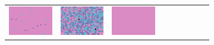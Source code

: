 \documentclass{ipol}
\begin{document}
\begin{figure}[ht]
\begin{subfigure}[t]{\linewidth}
\begin{tabular}{ccccccccc}
                \includegraphics[width=\s]{images/tower/DCB/iso_n5_128_grids.png}&
                \includegraphics[width=\s]{images/tower/DHT/iso_n5_128_grids.png}&
                \includegraphics[width=\s]{images/tower/LINEAR/iso_n5_128_grids.png}&

\end{tabular}
\end{subfigure}
\end{figure}
\end{document}
